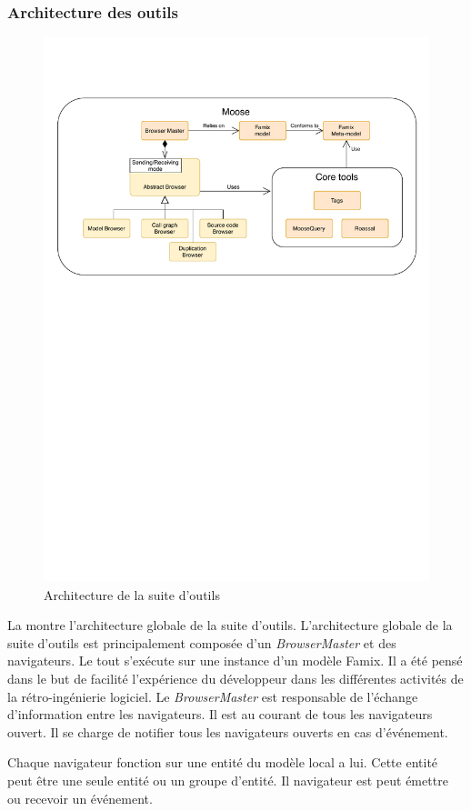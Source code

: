\documentclass[a4paper]{article}
\newcommand{\browserMaster}{\textit{BrowserMaster} \xspace}
\begin{document}
\subsubsection{Architecture des outils }
\begin{figure}[htbp]
  \begin{center}
  \includegraphics[width=0.7\linewidth]{./figures/architecture.pdf}
  \caption{Architecture de la suite d'outils}
  \label{fig:applicationArchitecture}
  \end{center}
  \vspace{-0.3cm}
\end{figure}

La  montre l'architecture globale de la suite d'outils.
L'architecture globale de la suite d'outils est principalement composée d'un \browserMaster et des navigateurs.
Le tout s'exécute sur une instance d'un modèle Famix. 
Il a été pensé dans le but de facilité l'expérience du développeur dans les différentes activités de la rétro-ingénierie logiciel.
Le \browserMaster est responsable de l'échange d'information entre les navigateurs.
Il est au courant de tous les navigateurs ouvert. 
Il se charge de notifier tous les navigateurs ouverts en cas d'événement.

Chaque navigateur fonction sur une entité du modèle  local a lui.
Cette entité peut être une seule entité ou un groupe d'entité.
Il navigateur est peut émettre ou recevoir un événement. 
\end{document}
